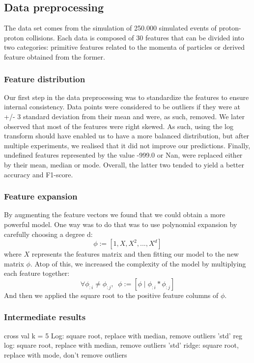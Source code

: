 \documentclass[10pt,conference,compsocconf]{IEEEtran}
\begin{document}
\subsection{Data preprocessing}
The data set comes from the simulation of 250.000 simulated events 
of proton-proton collisions. Each data is composed of 30 features 
that can be divided into two categories: primitive features related 
to the momenta of particles or derived feature obtained from the former.

\subsubsection{Feature distribution}
Our first step in the data preprocessing was to standardize the features 
to ensure internal consistency. Data points were considered to be 
outliers if they were at +/- 3 standard deviation from their mean and 
were, as such, removed. We later observed that most of the features 
were right skewed. As such, using the log transform should have enabled 
us to have a more balanced distribution, but after multiple experiments, 
we realised that it did not improve our predictions. 
Finally, undefined features represented by the value -999.0 or Nan, 
were replaced either by their mean, median or mode. Overall, the 
latter two tended to yield a better accuracy and F1-score.

\subsubsection{Feature expansion}
By augmenting the feature vectors we found that we could obtain a more 
powerful model. One way was to do that was to use polynomial expansion 
by carefully choosing a degree d:
$$\phi := [1, X, X^2, ..., X^d]$$
where $X$ represents the features matrix and then fitting our model 
to the new matrix $\phi$. Atop of this, we increased the complexity 
of the model by multiplying each feature together:
$$\forall \phi_{:i} \neq \phi_{:j}, \;\; \phi := [\phi\; |\; \phi_{:i} * \phi_{:j}] $$
And then we applied the square root to the positive feature columns 
of $\phi$.

\subsubsection{Intermediate results}
cross val k = 5
Log: square root, replace with median, remove outliers 'std'
reg log: square root, replace with median, remove outliers 'std'
ridge: square root, replace with mode, don't remove outliers
\end{document}

